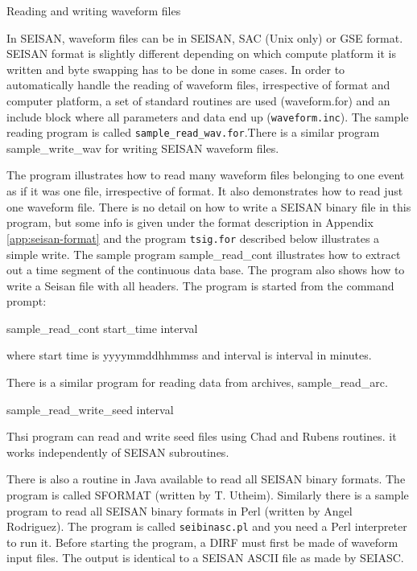 Reading %
and writing 
waveform files 

In SEISAN, waveform files can be in SEISAN, SAC (Unix only) or 
GSE format. SEISAN format is slightly different depending on which 
compute platform it is written and byte swapping has to be done in 
some cases. In order to automatically handle the reading of waveform 
files, irrespective of format and computer platform, a set of standard 
routines are used (waveform.for) and an include block where all 
parameters and data end up (\texttt{waveform.inc}). 
The sample %
reading 
program 
is called \texttt{sample\_read\_wav.for}.There is a similar program sample\_write\_wav for writing SEISAN waveform files. 

The program illustrates how to read many waveform files belonging 
to one event as if it was one file, irrespective of format. It also 
demonstrates how to read just one waveform file. There is no detail 
on how to write a SEISAN binary file in this program, but some info 
is given under the format description in Appendix 
\ref{app:seisan-format} 
and the program \texttt{tsig.for} described below illustrates a simple write. 
The sample program sample\_read\_cont illustrates how to 
extract out a time segment of the continuous data base. The program 
also shows how to write a Seisan file with all headers. The program 
is started from the command prompt: 

sample\_read\_cont start\_time interval 

where start time is yyyymmddhhmmss and interval is interval in minutes. 

There is a similar program for reading data from archives, sample\_read\_arc. 

sample\_read\_write\_seed interval

Thsi program can read and write seed files using Chad and Rubens routines. it works independently of SEISAN subroutines.

 There is also a routine in Java available 
to read all SEISAN binary formats. The program is called SFORMAT 
 (written by T. Utheim). Similarly there 
is a sample program to read all SEISAN binary formats in Perl 
(written by Angel Rodriguez). The program is called 
\texttt{seibinasc.pl} and you need a Perl interpreter to run it. 
Before starting the program, a DIRF must first be made of waveform 
input files. The output is identical to a SEISAN ASCII file as 
made by SEIASC.  

